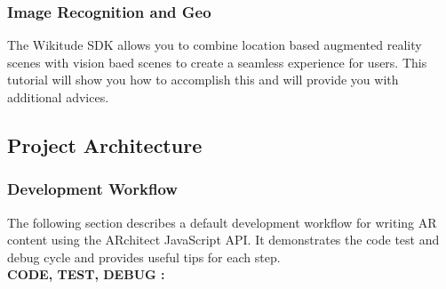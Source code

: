 \documentclass{article}
\begin{document}
\subsubsection{Image Recognition and Geo}
\par The Wikitude SDK allows you to combine location based augmented reality scenes with vision baed scenes to create a seamless experience for users. This tutorial will show you how to accomplish this and will provide you with additional advices. 

\subsection{ Project Architecture }
\subsubsection{Development Workflow}
\par The following section describes a default development workflow for writing AR content using the ARchitect JavaScript API. It demonstrates the code test and debug cycle and provides useful tips for each step. \\
\textbf{CODE, TEST, DEBUG :}
\end{document}

